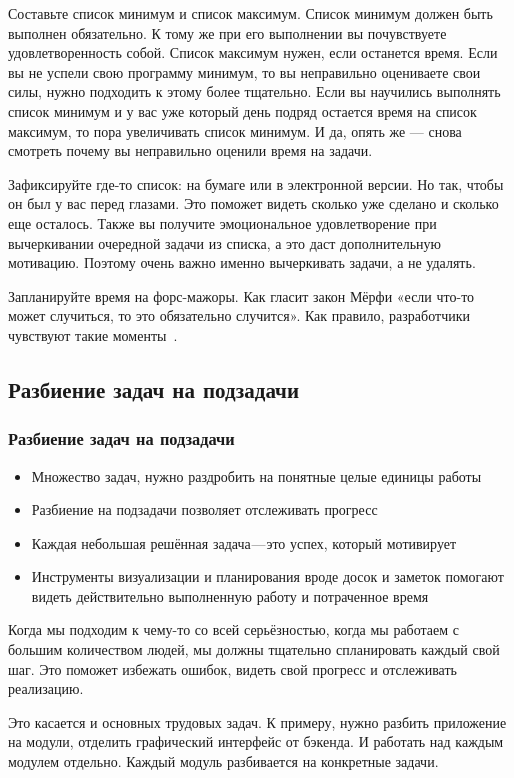 \documentclass{../industrial-development}
\begin{document}
Составьте список минимум и список максимум. Список минимум должен быть выполнен обязательно. К тому же при его выполнении вы почувствуете удовлетворенность собой. Список максимум нужен, если останется время. Если вы не успели свою программу минимум, то вы неправильно оцениваете свои силы, нужно подходить к этому более тщательно.
Если вы научились выполнять список минимум и у вас уже который день подряд остается время на список максимум, то пора увеличивать список минимум. И да, опять же — снова смотреть почему вы неправильно оценили время на задачи.

Зафиксируйте где-то список: на бумаге или в электронной версии. Но так, чтобы он был у вас перед глазами. Это поможет видеть сколько уже сделано и сколько еще осталось. Также вы получите эмоциональное удовлетворение при вычеркивании очередной задачи из списка, а это даст дополнительную мотивацию. Поэтому очень важно именно вычеркивать задачи, а не удалять.

Запланируйте время на форс-мажоры. Как гласит закон Мёрфи «если что-то может случиться, то это обязательно случится». Как правило, разработчики чувствуют такие моменты~\cite{TMHabr}.

\subsection{Разбиение задач на подзадачи}

\begin{frame} \frametitle{Разбиение задач на подзадачи}
  \begin{itemize}
  \item Множество задач, нужно раздробить на понятные целые единицы работы
  \item Разбиение на подзадачи позволяет отслеживать прогресс
  \item Каждая небольшая решённая задача — это успех, который мотивирует
  \item Инструменты визуализации и планирования вроде досок и заметок помогают видеть действительно выполненную работу и потраченное время
  \end{itemize}
\end{frame}

\lecturenotes

Когда мы подходим к чему-то со всей серьёзностью, когда мы работаем с большим количеством людей, мы должны тщательно спланировать каждый свой шаг. Это поможет избежать ошибок, видеть свой прогресс и отслеживать реализацию.

Это касается и основных трудовых задач. К примеру, нужно разбить приложение на модули, отделить графический интерфейс от бэкенда. И работать над каждым модулем отдельно.
Каждый модуль разбивается на конкретные задачи.
\end{document}

